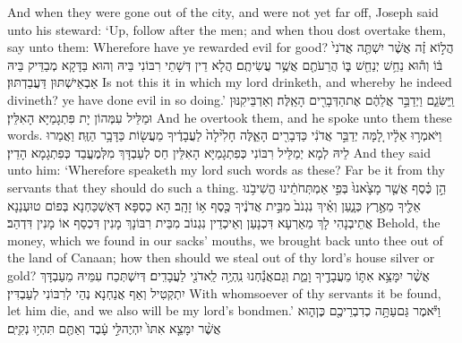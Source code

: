 {And when they were gone out of the city, and were not yet far off, Joseph said unto his steward: ‘Up, follow after the men; and when thou dost overtake them, say unto them: Wherefore have ye rewarded evil for good?}{}
{הֲל֣וֹא זֶ֗ה אֲשֶׁ֨ר יִשְׁתֶּ֤ה אֲדֹנִי֙ בּ֔וֹ וְה֕וּא נַחֵ֥שׁ יְנַחֵ֖שׁ בּ֑וֹ הֲרֵעֹתֶ֖ם אֲשֶׁ֥ר עֲשִׂיתֶֽם׃}
{הֲלָא דֵין דְּשָׁתֵי רִבּוֹנִי בֵּיהּ וְהוּא בַּדָּקָא מְבַדֵּיק בֵּיהּ אַבְאֵישְׁתּוּן דַּעֲבַדְתּוּן׃}
{Is not this it in which my lord drinketh, and whereby he indeed divineth? ye have done evil in so doing.’}{}
{וַֽיַּשִּׂגֵ֑ם וַיְדַבֵּ֣ר אֲלֵהֶ֔ם אֶת\maqqaf הַדְּבָרִ֖ים הָאֵֽלֶּה׃}
{וְאַדְבֵּיקִנּוּן וּמַלֵּיל עִמְּהוֹן יָת פִּתְגָמַיָּא הָאִלֵּין׃}
{And he overtook them, and he spoke unto them these words.}{}
{וַיֹּאמְר֣וּ אֵלָ֔יו לָ֚מָּה יְדַבֵּ֣ר אֲדֹנִ֔י כַּדְּבָרִ֖ים הָאֵ֑לֶּה חָלִ֙ילָה֙ לַעֲבָדֶ֔יךָ מֵעֲשׂ֖וֹת כַּדָּבָ֥ר הַזֶּֽה׃}
{וַאֲמַרוּ לֵיהּ לְמָא יְמַלֵּיל רִבּוֹנִי כְּפִתְגָמַיָּא הָאִלֵּין חַס לְעַבְדָּךְ מִלְּמֶעֱבַד כְּפִתְגָמָא הָדֵין׃}
{And they said unto him: ‘Wherefore speaketh my lord such words as these? Far be it from thy servants that they should do such a thing.}{}
{הֵ֣ן כֶּ֗סֶף אֲשֶׁ֤ר מָצָ֙אנוּ֙ בְּפִ֣י אַמְתְּחֹתֵ֔ינוּ הֱשִׁיבֹ֥נוּ אֵלֶ֖יךָ מֵאֶ֣רֶץ כְּנָ֑עַן וְאֵ֗יךְ נִגְנֹב֙ מִבֵּ֣ית אֲדֹנֶ֔יךָ כֶּ֖סֶף א֥וֹ זָהָֽב׃}
{הָא כַסְפָּא דְּאַשְׁכַּחְנָא בְּפוֹם טוּעְנַנָא אֲתֵיבְנָהִי לָךְ מֵאַרְעָא דִּכְנָעַן וְאֵיכְדֵין נִגְנוֹב מִבֵּית רִבּוֹנָךְ מָנִין דִּכְסַף אוֹ מָנִין דִּדְהַב׃}
{Behold, the money, which we found in our sacks’ mouths, we brought back unto thee out of the land of Canaan; how then should we steal out of thy lord’s house silver or gold?}{}
{אֲשֶׁ֨ר יִמָּצֵ֥א אִתּ֛וֹ מֵעֲבָדֶ֖יךָ וָמֵ֑ת וְגַם\maqqaf אֲנַ֕חְנוּ נִֽהְיֶ֥ה לַֽאדֹנִ֖י לַעֲבָדִֽים׃}
{דְּיִשְׁתְּכַח עִמֵּיהּ מֵעַבְדָּךְ יִתְקְטִיל וְאַף אֲנַחְנָא נְהֵי לְרִבּוֹנִי לְעַבְדִּין׃}
{With whomsoever of thy servants it be found, let him die, and we also will be my lord’s bondmen.’}{}
{וַיֹּ֕אמֶר גַּם\maqqaf עַתָּ֥ה כְדִבְרֵיכֶ֖ם כֶּן\maqqaf ה֑וּא אֲשֶׁ֨ר יִמָּצֵ֤א אִתּוֹ֙ יִהְיֶה\maqqaf לִּ֣י עָ֔בֶד וְאַתֶּ֖ם תִּהְי֥וּ נְקִיִּֽם׃}
